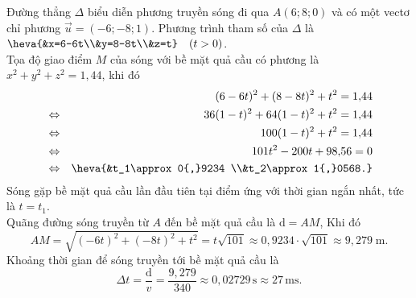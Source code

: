 \begin{ex}
{\begin{itemchoice}
\begin{center}
			\end{center}
			Đường thẳng $\Delta$ biểu diễn phương truyền sóng đi qua $A(6;8;0)$ và có một vectơ chỉ phương $\overrightarrow{u}=(-6;-8;1)$. Phương trình tham số của $\Delta$ là
			$\heva{&x=6-6t\\&y=8-8t\\&z=t}\quad(t>0)$.\\
			Tọa độ giao điểm $M$ của sóng với bề mặt quả cầu có phương là $x^2+y^2+z^2=1{,}44$, khi đó
			\allowdisplaybreaks
			\begin{eqnarray*}
				&&(6 - 6t)^2 + (8 - 8t)^2 + t^2= 1{,}44 \\
				&\Leftrightarrow& 36(1 - t)^2 + 64(1 - t)^2 + t^2= 1{,}44 \\
				&\Leftrightarrow& 100(1 - t)^2 + t^2= 1{,}44 \\
				&\Leftrightarrow& 101t^2 - 200t + 98{,}56= 0\\
				&\Leftrightarrow& \heva{&t_1\approx 0{,}9234 \\&t_2\approx 1{,}0568.}
			\end{eqnarray*}
			Sóng gặp bề mặt quả cầu lần đầu tiên tại điểm ứng với thời gian ngắn nhất, tức là $t=t_1$.\\
			Quãng đường sóng truyền từ $A$ đến bề mặt quả cầu là $\mathrm{d}=AM$, Khi đó
			\[AM = \sqrt{(-6t)^2 + (-8t)^2 + t^2} = t\sqrt{101} \approx 0{,}9234 \cdot \sqrt{101} \approx 9{,}279\; \mathrm{m}.\]
			Khoảng thời gian để sóng truyền tới bề mặt quả cầu là
			\[\Delta t = \dfrac{\mathrm{d}}{v} = \dfrac{9{,}279}{340} \approx 0{,}02729 \mathrm{\,s}\approx 27\mathrm{\,ms}.\]
		\end{itemchoice}
	}
\end{ex}
\caukq
